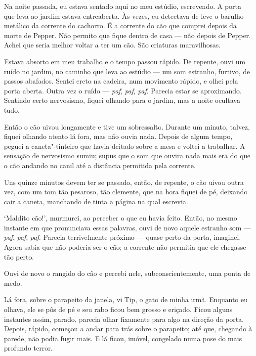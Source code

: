 Na noite passada, eu estava sentado aqui no meu estúdio, escrevendo. A porta que leva ao jardim estava entreaberta. Às
vezes, eu detectava de leve o barulho metálico da corrente do cachorro. É a corrente do cão que comprei depois da morte de
Pepper. Não permito que fique dentro de casa --- não depois de Pepper. Achei que seria melhor voltar a ter um cão. São criaturas
maravilhosas.

Estava absorto em meu trabalho e o tempo passou rápido. De repente, ouvi um ruído no jardim, no caminho que leva ao
estúdio --- um som estranho, furtivo, de passos abafados. Sentei ereto na cadeira, num movimento rápido, e olhei pela
porta aberta. Outra vez o ruído --- \textit{paf}, \textit{paf}, \textit{paf}. Parecia estar se aproximando. Sentindo
certo nervosismo, fiquei olhando para o jardim, mas a noite ocultava tudo. 

Então o cão uivou longamente e tive um sobressalto. Durante um minuto, talvez, fiquei olhando atento lá fora,
mas não ouvia nada. Depois de algum tempo, peguei a caneta"-tinteiro que havia deitado sobre a mesa e voltei a
trabalhar. A sensação de nervosismo sumiu; supus que o som que ouvira nada mais era do que o cão andando no canil até a
distância permitida pela corrente.

Uns quinze minutos devem ter se passado, então, de repente, o cão uivou outra vez, com um tom tão pesaroso, tão
clemente, que na hora fiquei de pé, deixando cair a caneta, manchando de tinta a página na qual escrevia. 

‘Maldito cão!’, murmurei, ao perceber o que eu havia feito. Então, no mesmo instante em que pronunciava essas palavras,
ouvi de novo aquele estranho som --- \textit{paf}, \textit{paf}, \textit{paf}. Parecia terrivelmente próximo --- quase
perto da porta, imaginei. Agora sabia que não poderia ser o cão; a corrente não permitia que ele chegasse tão perto.

Ouvi de novo o rangido do cão e percebi nele, subconscientemente, uma ponta de medo.

Lá fora, sobre o parapeito da janela, vi Tip, o gato de minha irmã. Enquanto eu olhava, ele se pôs de pé e seu rabo
ficou bem grosso e eriçado. Ficou alguns instantes assim, parado, parecia olhar fixamente para algo na direção
da porta. Depois, rápido, começou a andar para trás sobre o parapeito; até que, chegando à parede, não podia fugir
mais. E lá ficou, imóvel, congelado numa pose do mais profundo terror.

